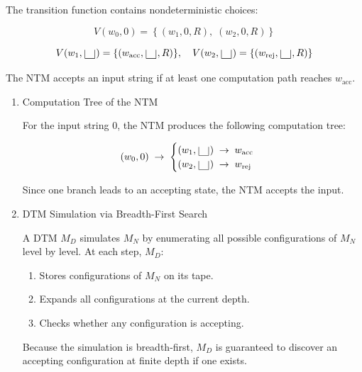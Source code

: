 \documentclass[12pt,a4paper,openany]{article}
\begin{document}
The transition function contains nondeterministic choices:

\[
V(w_0, 0) =
\left\{
(w_1, 0, R),\;
(w_2, 0, R)
\right\}
\]

\[
V(w_1, \scalebox{2.5}{\textvisiblespace}) = \{(w_{\text{acc}}, \scalebox{2.5}{\textvisiblespace}, R)\}, \quad
V(w_2, \scalebox{2.5}{\textvisiblespace}) = \{(w_{\text{rej}}, \scalebox{2.5}{\textvisiblespace}, R)\}
\]

The NTM accepts an input string if at least one computation path reaches
$w_{\text{acc}}$.

\begin{enumerate}

\item Computation Tree of the NTM

For the input string $0$, the NTM produces the following computation tree:

\[
(w_0, 0) \;\to\;
\begin{cases}
(w_1, \scalebox{2.5}{\textvisiblespace}) \;\to\; w_{\text{acc}} \\
(w_2, \scalebox{2.5}{\textvisiblespace}) \;\to\; w_{\text{rej}}
\end{cases}
\]

Since one branch leads to an accepting state, the NTM accepts the input.

\item DTM Simulation via Breadth-First Search

A DTM $M_D$ simulates $M_N$ by enumerating all
possible configurations of $M_N$ level by level. At each step, $M_D$:

\begin{enumerate}
  \item Stores configurations of $M_N$ on its tape.
  \item Expands all configurations at the current depth.
  \item Checks whether any configuration is accepting.
\end{enumerate}

Because the simulation is breadth-first, $M_D$ is guaranteed to discover an
accepting configuration at finite depth if one exists.

\end{enumerate}

\begin{center}
\end{center}
\end{document}
